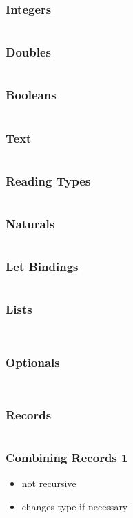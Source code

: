 \documentclass{beamer}
\begin{document}
 \begin{frame}[fragile]
   \frametitle{Integers}
   \inputminted{text}{static-source/ints.out}
 \end{frame}

 \begin{frame}[fragile]
   \frametitle{Doubles}
   \inputminted{text}{static-source/doubles.out}
 \end{frame}

 \begin{frame}[fragile]
   \frametitle{Booleans}
   \inputminted{text}{static-source/bools.out}
 \end{frame}

 \begin{frame}[fragile]
   \frametitle{Text}
   \inputminted{text}{static-source/texts.out}
 \end{frame}

 \begin{frame}[fragile]
   \frametitle{Reading Types}
   \inputminted{text}{static-source/types.out}
 \end{frame}

 \begin{frame}[fragile]
   \frametitle{Naturals}
   \inputminted{text}{static-source/nats.out}
 \end{frame}

 \begin{frame}[fragile]
   \frametitle{Let Bindings}
   \inputminted{text}{dhall/lets.dhall}
 \end{frame}

 \begin{frame}[fragile]
   \frametitle{Lists}
   \inputminted{text}{static-source/lists.out}
   \inputminted{text}{dhall/list-fold.dhall}
 \end{frame}

 \begin{frame}[fragile]
   \frametitle{Optionals}
   \inputminted[fontsize=\footnotesize]{text}{static-source/optionals.out}
   \inputminted[fontsize=\footnotesize]{text}{dhall/optional-fold.dhall}
 \end{frame}

 \begin{frame}[fragile]
   \frametitle{Records}
   \inputminted{text}{static-source/records.out}
 \end{frame}

 \begin{frame}[fragile]
   \frametitle{Combining Records 1}
   \begin{itemize}
   \item not recursive
   \item changes type if necessary
   \end{itemize}
   \inputminted{text}{static-source/records-combine1.out}
 \end{frame}
\end{document}
